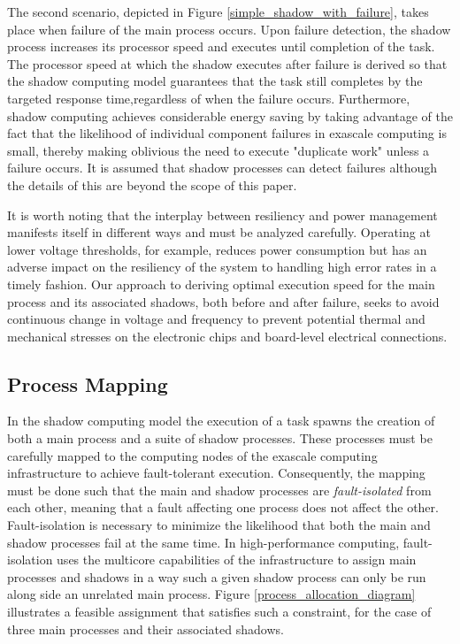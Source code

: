 The second scenario, depicted in Figure
\ref{simple_shadow_with_failure}, takes place when failure of the main
process occurs. Upon failure detection, the shadow process increases
its processor speed and executes until completion of the task.  The
processor speed at which the shadow executes after failure is derived
so that the shadow computing model guarantees that the task still
completes by the targeted response time,regardless of when the failure
occurs. Furthermore, shadow computing achieves considerable energy
saving by taking advantage of the fact that the likelihood of
individual component failures in exascale computing is small, thereby
making oblivious the need to execute "duplicate work" unless a failure
occurs. It is assumed that shadow processes can detect failures
although the details of this are beyond the scope of this paper.


It is worth noting that the interplay between resiliency and power
management manifests itself in different ways and must be analyzed
carefully. Operating at lower voltage thresholds, for example, reduces
power consumption but has an adverse impact on the resiliency of the
system to handling high error rates in a timely fashion. Our approach
to deriving optimal execution speed for the main process and its
associated shadows, both before and after failure, seeks to avoid
continuous change in voltage and frequency to prevent potential
thermal and mechanical stresses on the electronic chips and
board-level electrical connections.


\subsection{Process Mapping}

In the shadow computing model the execution of a task spawns the
creation of both a main process and a suite of shadow processes. These
processes must be carefully mapped to the computing nodes of the
exascale computing infrastructure to achieve fault-tolerant execution.
Consequently, the mapping must be done such that the main and shadow
processes are {\it fault-isolated} from each other, meaning that a
fault affecting one process does not affect the other. Fault-isolation
is necessary to minimize the likelihood that both the main and shadow
processes fail at the same time. In high-performance computing,
fault-isolation uses the multicore capabilities of the infrastructure
to assign main processes and shadows in a way such a given shadow
process can only be run along side an unrelated main process.  Figure
\ref{process_allocation_diagram} illustrates a feasible assignment that
satisfies such a constraint, for the case of three main processes and
their associated shadows.

